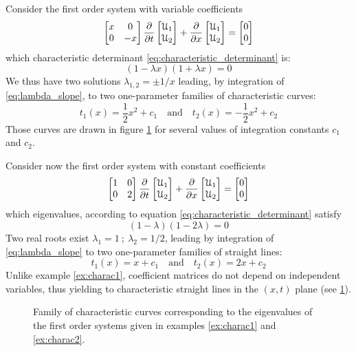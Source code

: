 \begin{example}
  \label{ex:charac1}
  Consider the first order system with variable coefficients
\begin{equation*}
 \left[\begin{matrix}x &0 \\0 &-x\end{matrix}\right] \frac{\partial }{\partial t} \left[\begin{matrix}\mathcal{U}_1 \\ \mathcal{U}_2\end{matrix}\right] + \frac{\partial }{\partial x}\left[\begin{matrix}\mathcal{U}_1 \\ \mathcal{U}_2\end{matrix}\right] = \left[\begin{matrix}0 \\0\end{matrix}\right]
\end{equation*}
which characteristic determinant \eqref{eq:characteristic_determinant} is:
\begin{equation*}
  (1-\lambda x)(1+\lambda x)=0
\end{equation*}
We thus have two solutions $\lambda_{1,2}=\pm 1/x$ leading, by integration of \eqref{eq:lambda_slope}, to two one-parameter families of characteristic curves:
\begin{equation*}
  t_1(x)=\frac{1}{2}x^2+c_1  \quad \text{and} \quad t_2(x)=-\frac{1}{2}x^2+c_2 
\end{equation*}
Those curves are drawn in figure \ref{fig:exampleCharac} for several values of integration constants $c_1$ and $c_2$.
\end{example}
\begin{example}
  \label{ex:charac2}
  Consider now the first order system with constant coefficients
\begin{equation*}
 \left[\begin{matrix}1 &0 \\0 &2\end{matrix}\right] \frac{\partial }{\partial t} \left[\begin{matrix}\mathcal{U}_1 \\ \mathcal{U}_2\end{matrix}\right] + \frac{\partial }{\partial x}\left[\begin{matrix}\mathcal{U}_1 \\ \mathcal{U}_2\end{matrix}\right] = \left[\begin{matrix}0 \\0\end{matrix}\right]
\end{equation*}
which eigenvalues, according to equation \eqref{eq:characteristic_determinant} satisfy
\begin{equation*}
  (1 - \lambda )(1- 2\lambda)=0
\end{equation*}
Two real roots exist $\lambda_1=1 \: ; \: \lambda_2=1/2$, leading by integration of \eqref{eq:lambda_slope} to two one-parameter families of straight lines:
\begin{equation*}
  t_1(x)=x+c_1  \quad \text{and} \quad t_2(x)=2x+c_2 
\end{equation*}
Unlike example \ref{ex:charac1}, coefficient matrices do not depend on independent variables, thus yielding to characteristic straight lines in the $(x,t)$ plane (see \ref{fig:exampleCharac}).
\end{example}
\begin{figure}[h]
  \centering
  \caption{Family of characteristic curves corresponding to the eigenvalues of the first order systems given in examples \ref{ex:charac1} and \ref{ex:charac2}.}
  \label{fig:exampleCharac}
\end{figure}

